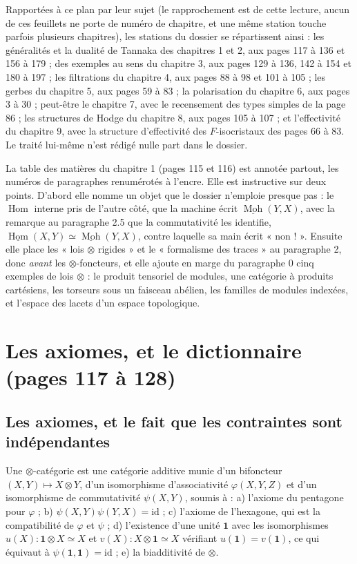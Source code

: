 \documentclass[11pt,a4paper]{article}
\begin{document}
Rapportées à ce plan par leur sujet (le rapprochement est de cette lecture,
aucun de ces feuillets ne porte de numéro de chapitre, et une même station
touche parfois plusieurs chapitres), les stations du dossier se répartissent
ainsi : les généralités et la dualité de Tannaka des chapitres 1 et 2, aux
pages 117 à 136 et 156 à 179 ; des exemples au sens du chapitre 3, aux pages
129 à 136, 142 à 154 et 180 à 197 ; les filtrations du chapitre 4, aux pages
88 à 98 et 101 à 105 ; les gerbes du chapitre 5, aux pages 59 à 83 ; la
polarisation du chapitre 6, aux pages 3 à 30 ; peut-être le chapitre 7, avec
le recensement des types simples de la page 86 ; les structures de Hodge du
chapitre 8, aux pages 105 à 107 ; et l'effectivité du chapitre 9, avec la
structure d'effectivité des $F$-isocristaux des pages 66 à 83. Le traité
lui-même n'est rédigé nulle part dans le dossier.

La table des matières du chapitre 1 (pages 115 et 116) est annotée partout, les
numéros de paragraphes renumérotés à l'encre. Elle est instructive sur deux
points. D'abord elle nomme un objet que le dossier n'emploie presque pas : le
$\operatorname{Hom}$ interne pris de l'autre côté, que la machine écrit
$\underline{\operatorname{Moh}}(Y,X)$, avec la remarque au paragraphe 2.5 que
la commutativité les identifie, $\underline{\operatorname{Hom}}(X,Y) \simeq
\underline{\operatorname{Moh}}(Y,X)$, contre laquelle sa main écrit
« non ! ». Ensuite elle place les « lois $\otimes$ rigides » et le
« formalisme des traces » au paragraphe 2, donc \emph{avant} les
$\otimes$-foncteurs, et elle ajoute en marge du paragraphe 0 cinq exemples de
lois $\otimes$ : le produit tensoriel de modules, une catégorie à produits
cartésiens, les torseurs sous un faisceau abélien, les familles de modules
indexées, et l'espace des lacets d'un espace topologique.

\section*{Les axiomes, et le dictionnaire (pages 117 à 128)}

\subsection*{Les axiomes, et le fait que les contraintes sont indépendantes}

Une $\otimes$-catégorie est une catégorie additive munie d'un bifoncteur
$(X,Y) \mapsto X \otimes Y$, d'un isomorphisme d'associativité
$\varphi(X,Y,Z)$ et d'un isomorphisme de commutativité $\psi(X,Y)$, soumis à :
a) l'axiome du pentagone pour $\varphi$ ; b) $\psi(X,Y)\psi(Y,X) =
\mathrm{id}$ ; c) l'axiome de l'hexagone, qui est la compatibilité de $\varphi$
et $\psi$ ; d) l'existence d'une unité $\mathbf{1}$ avec les isomorphismes
$u(X) \colon \mathbf{1} \otimes X \simeq X$ et $v(X) \colon X \otimes \mathbf{1}
\simeq X$ vérifiant $u(\mathbf{1}) = v(\mathbf{1})$, ce qui équivaut à
$\psi(\mathbf{1},\mathbf{1}) = \mathrm{id}$ ; e) la biadditivité de $\otimes$.
\end{document}
